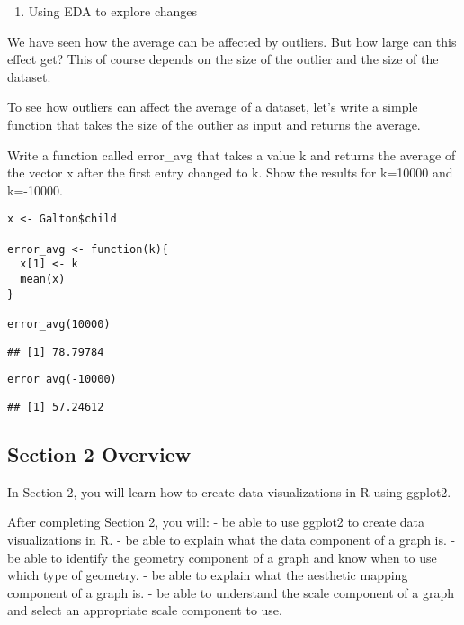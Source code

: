 \documentclass[]{article}
\providecommand{\tightlist}{%
  \setlength{\itemsep}{0pt}\setlength{\parskip}{0pt}}
\begin{document}
\begin{enumerate}
\def\labelenumi{\arabic{enumi}.}
\setcounter{enumi}{7}
\tightlist
\item
  Using EDA to explore changes
\end{enumerate}

We have seen how the average can be affected by outliers. But how large
can this effect get? This of course depends on the size of the outlier
and the size of the dataset.

To see how outliers can affect the average of a dataset, let's write a
simple function that takes the size of the outlier as input and returns
the average.

Write a function called error\_avg that takes a value k and returns the
average of the vector x after the first entry changed to k. Show the
results for k=10000 and k=-10000.

\begin{verbatim}
x <- Galton$child

error_avg <- function(k){
  x[1] <- k
  mean(x)
}

error_avg(10000)
\end{verbatim}

\begin{verbatim}
## [1] 78.79784
\end{verbatim}

\begin{verbatim}
error_avg(-10000)
\end{verbatim}

\begin{verbatim}
## [1] 57.24612
\end{verbatim}

\hypertarget{section-2-overview}{%
\subsection{Section 2 Overview}\label{section-2-overview}}

In Section 2, you will learn how to create data visualizations in R
using ggplot2.

After completing Section 2, you will: - be able to use ggplot2 to create
data visualizations in R. - be able to explain what the data component
of a graph is. - be able to identify the geometry component of a graph
and know when to use which type of geometry. - be able to explain what
the aesthetic mapping component of a graph is. - be able to understand
the scale component of a graph and select an appropriate scale component
to use.
\end{document}
